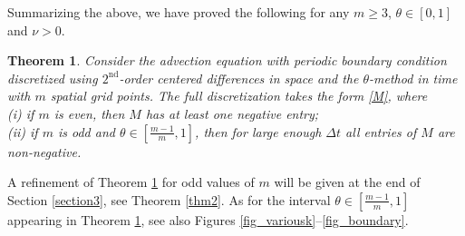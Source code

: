 \documentclass[a4paper]{article}
\newtheorem{theorem}{Theorem}
\newcommand{\dt}{\Delta t}
\newcommand{\te}{\theta}
\begin{document}
\begin{description}[style=unboxed,leftmargin=0cm]
Summarizing the above, we have proved the following for any $m\ge 3$, $\te\in[0,1]$ and
$\nu>0$.
\end{description}
\begin{theorem}\label{thm1}
Consider the advection equation with periodic boundary condition discretized using $2^{\text{nd}}$-order centered
differences in space and the $\theta$-method in time with $m$ spatial grid points.  
The full discretization takes the form \eqref{M},
where\\
(i) if $m$ is even, then $M$ has at least one negative entry;\\
(ii) if $m$ is odd and $\theta\in\left[\frac{m-1}{m},1\right]$, then for large enough $\dt$ all
entries of $M$ are non-negative.
\end{theorem}



A refinement of Theorem \ref{thm1} for odd values of $m$ will be given at the end of Section \ref{section3}, see Theorem \ref{thm2}.
As for the interval $\theta\in\left[\frac{m-1}{m},1\right]$ appearing in Theorem \ref{thm1}, see also 
Figures \ref{fig_variousk}--\ref{fig_boundary}.
\end{document}
